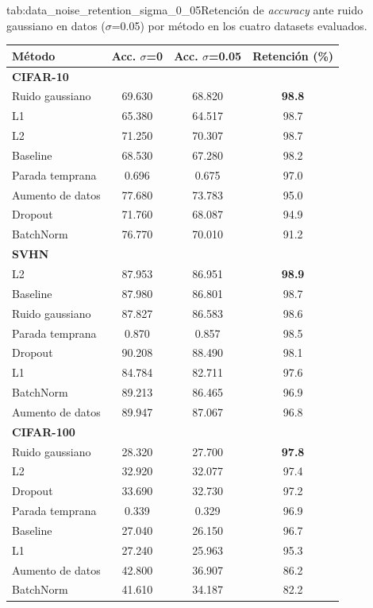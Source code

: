 \begin{table}{tab:data_noise_retention_sigma_0_05}{Retención de \textit{accuracy} ante ruido gaussiano en datos ($\sigma$=0.05) por método en los cuatro datasets evaluados.}
\small
\begin{tabular}{lccc}
\toprule
\textbf{Método} & \textbf{Acc. $\sigma$=0} & \textbf{Acc. $\sigma$=0.05} & \textbf{Retención (\%)} \\
\midrule
\multicolumn{4}{l}{\textbf{CIFAR-10}}\\
\midrule
Ruido gaussiano & 69.630 & 68.820 & \textbf{98.8} \\
L1 & 65.380 & 64.517 & 98.7 \\
L2 & 71.250 & 70.307 & 98.7 \\
Baseline & 68.530 & 67.280 & 98.2 \\
Parada temprana & 0.696 & 0.675 & 97.0 \\
Aumento de datos & 77.680 & 73.783 & 95.0 \\
Dropout & 71.760 & 68.087 & 94.9 \\
BatchNorm & 76.770 & 70.010 & 91.2 \\
\midrule
\multicolumn{4}{l}{\textbf{SVHN}}\\
\midrule
L2 & 87.953 & 86.951 & \textbf{98.9} \\
Baseline & 87.980 & 86.801 & 98.7 \\
Ruido gaussiano & 87.827 & 86.583 & 98.6 \\
Parada temprana & 0.870 & 0.857 & 98.5 \\
Dropout & 90.208 & 88.490 & 98.1 \\
L1 & 84.784 & 82.711 & 97.6 \\
BatchNorm & 89.213 & 86.465 & 96.9 \\
Aumento de datos & 89.947 & 87.067 & 96.8 \\
\midrule
\multicolumn{4}{l}{\textbf{CIFAR-100}}\\
\midrule
Ruido gaussiano & 28.320 & 27.700 & \textbf{97.8} \\
L2 & 32.920 & 32.077 & 97.4 \\
Dropout & 33.690 & 32.730 & 97.2 \\
Parada temprana & 0.339 & 0.329 & 96.9 \\
Baseline & 27.040 & 26.150 & 96.7 \\
L1 & 27.240 & 25.963 & 95.3 \\
Aumento de datos & 42.800 & 36.907 & 86.2 \\
BatchNorm & 41.610 & 34.187 & 82.2 \\

\end{tabular}
\end{table}
